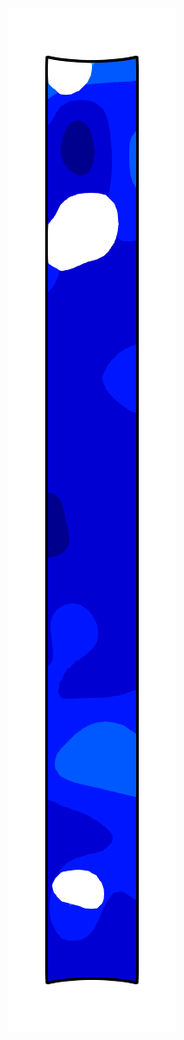 \begin{figure}[!htb]
\begin{subfigure}{0.08\textwidth}
  \end{subfigure}
  \begin{subfigure}{0.08\textwidth}
    \centering
    \includegraphics[width=\textwidth]{Chapter5/figures/spallation/psie_3}

\end{subfigure}
\end{figure}
